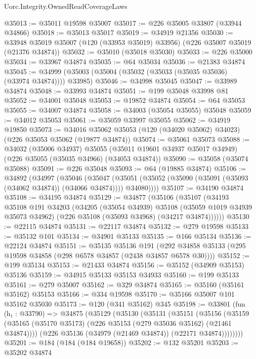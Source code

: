 \begin{lexlean}{Uorc.Integrity.OwnedReadCoverageLaws}
\begin{coremodule}
@35013 := @35011 @19598 @35007
@35017 := @226 @35005 @33807 (@33944 @34866)
@35018 := @35013 @35017
@35019 := @34919 @21356
@35030 := @33948 @35019 @35007 (@120 (@33953 @35019) @33956) (@226 @35007 @35019 (@21376 @34874))
@35032 := @35010 (@35018 @35030)
@35033 := @226 @35000
@35034 := @33967 @34874
@35035 := @64 @35034
@35036 := @21383 @34874
@35045 := @34999 (@35003 (@35004 (@35032 (@35033 (@35035 @35036) (@33974 @34874)))) @33985)
@35046 := @34998 @35045
@35047 := @33989 @34874
@35048 := @33993 @34874
@35051 := @199 @35048 @33998 @81
@35052 := @34001 @35048
@35053 := @19852 @34874
@35054 := @64 @35053
@35055 := @34007 @34874
@35058 := @34003 (@35054 @35055) @35048
@35059 := @34012 @35053
@35061 := @35059 @33997 @35055
@35062 := @34919 @19850
@35073 := @34016 @35062 @35053 (@120 (@34020 @35062) @34023) (@226 @35053 @35062 (@19877 @34874))
@35074 := @35061 @35073
@35088 := @34032
    (@35006 @34937)
    @35055
    (@35011 @19601 @34937 @35017 @34949)
    (@226 @35055 (@35035 @34966) (@34053 @34874))
@35090 := @35058 (@35074 @35088)
@35091 := @226 @35048
@35093 := @64 (@19885 @34874)
@35106 := @34892
    (@34997
      (@35046
        (@35047
          (@35051 (@35052 (@35090 (@35091 (@35093 (@34062 @34874)) (@34066 @34874)))) @34080))))
@35107 := @34190 @34874
@35108 := @34195 @34874
@35129 := @34877
    (@35106
      (@35107
        (@34193
          @35108
          @191
          @34203
          (@34205
            (@35054 @34939)
            @35108
            (@35059 @1019 @34939 @35073 @34962)
            (@226 @35108 (@35093 @34968) (@34217 @34874))))))
@35130 := @22115 @34874
@35131 := @22117 @34874
@35132 := @279 @19598
@35133 := @35132 @101
@35134 := @34901 @35133
@35135 := @166 @35134
@35136 := @22124 @34874
@35151 := @35135
    @35136
    @191
    (@292 @34858 @35133 (@295 @19598 @34858 (@298 @6578 @34857 (@2438 @34857 @6578 @30))))
@35152 := @199 @35134
@35153 := @21433 @34874
@35156 := @35152 (@34909 @35153) @35136
@35159 := @34915 @35133 @35153 @34933
@35160 := @199 @35133
@35161 := @279 @35007
@35162 := @329 @34874
@35165 := @35160 (@35161 @35162) @35153
@35166 := @334 @19598
@35170 := @35166 @35007 @101 @35162 @35030
@35173 := @120 (@341 @35162) @345
@35198 := @33801
    (fun (h₁ : @33790) =>
    @34875
      (@35129
        (@35130
          (@35131
            (@35151
              (@35156
                (@35159 (@35165 (@35170 @35173) (@226 @35153 (@279 @35036 @35162) (@21461 @34874))))
                (@226 @35136 (@34979 (@21469 @34874)) (@22171 @34874))))))))
@35201 := @184 (@184 (@184 @19658))
@35202 := @132 @35201
@35203 := @35202 @34874

\end{coremodule}
\end{lexlean}
